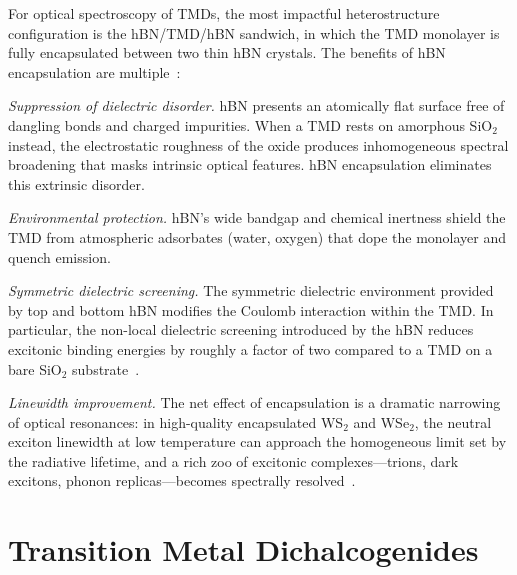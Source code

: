For optical spectroscopy of TMDs, the most impactful heterostructure configuration is the hBN/TMD/hBN sandwich, in which the TMD monolayer is fully encapsulated between two thin hBN crystals.
The benefits of hBN encapsulation are multiple~\cite{cadiz-2017}:

\textit{Suppression of dielectric disorder.}
hBN presents an atomically flat surface free of dangling bonds and charged impurities.
When a TMD rests on amorphous SiO$_2$ instead, the electrostatic roughness of the oxide produces inhomogeneous spectral broadening that masks intrinsic optical features.
hBN encapsulation eliminates this extrinsic disorder.

\textit{Environmental protection.}
hBN's wide bandgap and chemical inertness shield the TMD from atmospheric adsorbates (water, oxygen) that dope the monolayer and quench emission.

\textit{Symmetric dielectric screening.}
The symmetric dielectric environment provided by top and bottom hBN modifies the Coulomb interaction within the TMD.
In particular, the non-local dielectric screening introduced by the hBN reduces excitonic binding energies by roughly a factor of two compared to a TMD on a bare SiO$_2$ substrate~\cite{raja-2017}.

\textit{Linewidth improvement.}
The net effect of encapsulation is a dramatic narrowing of optical resonances: in high-quality encapsulated WS$_2$ and WSe$_2$, the neutral exciton linewidth at low temperature can approach the homogeneous limit set by the radiative lifetime, and a rich zoo of excitonic complexes---trions, dark excitons, phonon replicas---becomes spectrally resolved~\cite{cadiz-2017,zinkiewicz-2021}.



\section{Transition Metal Dichalcogenides}
\label{sec:TMDs}

